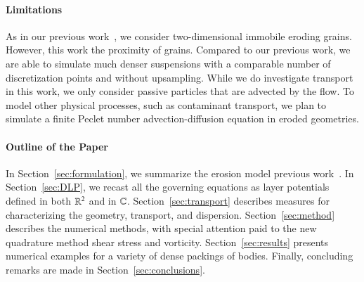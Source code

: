\documentclass[preprint,10pt]{elsarticle}
\begin{document}
\paragraph{Limitations}
As in our previous work~\cite{qua-moo2018}, we consider two-dimensional
immobile eroding grains. However, this work  the proximity of  grains. Compared to our previous work, we are able to
simulate much denser suspensions with a comparable number of
discretization points and without upsampling.  While we do investigate
transport in this work, we only consider passive particles that are
advected by the flow.  To model other physical processes, such as
contaminant transport, we plan to simulate a finite Peclet number
advection-diffusion equation in eroded geometries.


\paragraph{Outline of the Paper}
In Section~\ref{sec:formulation}, we summarize the erosion model  previous work~\cite{qua-moo2018}.  In
Section~\ref{sec:DLP}, we recast all the governing equations as layer
potentials defined in both ${\mathbb{R}}^2$ and in ${\mathbb{C}}$.
Section~\ref{sec:transport} describes measures for characterizing the
geometry, transport, and dispersion. Section~\ref{sec:method} describes
the numerical methods, with special attention paid to the new quadrature
method  shear stress and vorticity.
Section~\ref{sec:results} presents numerical examples for a variety of
dense packings of bodies.  Finally, concluding remarks are made in
Section~\ref{sec:conclusions}.

\end{document}
